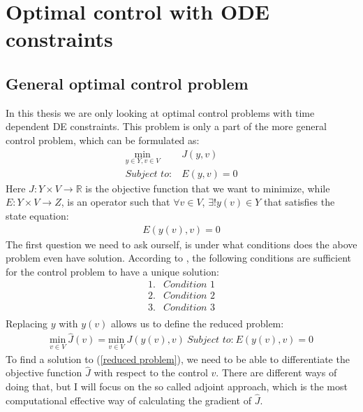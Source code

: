 \chapter{Optimal control with ODE constraints}
\section{General optimal control problem}
In this thesis we are only looking at optimal control problems with time dependent DE constraints. This problem is only a part of the more general control problem, which can be formulated as:
\begin{align}
\underset{y\in Y,v\in V}{\text{min}} \ &J(y,v) \\
\textit{Subject to:} \ &E(y,v)=0
\end{align}
Here $J: Y\times V\rightarrow\mathbb{R}$ is the objective function that we want to minimize, while $E:Y\times V \rightarrow Z$, is an operator such that $\forall v \in V$, $\exists! y(v)\in Y$ that satisfies the state equation:
\begin{align*}
E(y(v),v)=0
\end{align*}
The first question we need to ask ourself, is under what conditions does the above problem even have solution. According to \cite{hinze2008optimization}, the following conditions are sufficient for the control problem to have a unique solution:
\begin{align*}
1. &\textit{Condition 1} \\
2. &\textit{Condition 2} \\
3. &\textit{Condition 3} \\
\end{align*}  
Replacing $y$ with $y(v)$ allows us to define the reduced problem:
\begin{align}
\underset{v\in V}{\text{min}} \ \hat J(v)=\underset{v\in V}{\text{min}} \ J(y(v),v) \ \textit{Subject to:} \ E(y(v),v)=0 \label{reduced problem}
\end{align}
To find a solution to (\ref{reduced problem}), we need to be able to differentiate the objective function $\hat{J}$ with respect to the control $v$. There are different ways of doing that, but I will focus on the so called adjoint approach, which is the most computational effective way of calculating the gradient of $\hat{J}$.
